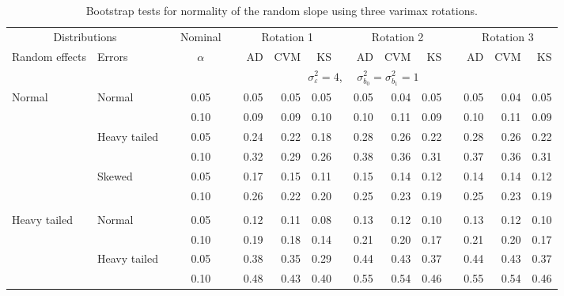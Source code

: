 \documentclass[11pt]{article} %
\begin{document}
\begin{table}[ht]
\begin{scriptsize}
\begin{center}
\begin{tabular}{ll p{.1cm} c p{.1cm} rrr p{.1cm} rrr p{.1cm} rrr}
   \hline
\end{tabular}
\end{center}
\end{scriptsize}
\end{table}

\begin{table}[ht]
\caption{Bootstrap tests for normality of the random slope using three varimax rotations.}
\begin{scriptsize}
\begin{center}
\begin{tabular}{ll p{.1cm} c p{.1cm} rrr p{.1cm} rrr p{.1cm} rrr}
  \hline
  \multicolumn{2}{c}{Distributions}& & Nominal & &  \multicolumn{3}{c}{Rotation 1} & & \multicolumn{3}{c}{Rotation 2} & & \multicolumn{3}{c}{Rotation 3}\\ \cline{1-2} \cline{6-8} \cline{10-12} \cline{14-16}
  Random effects & Errors & & $\alpha$ & & AD & CVM & KS & & AD & CVM & KS & & AD & CVM & KS \\ 
   \hline
& && && \multicolumn{9}{c}{$\sigma_{\varepsilon}^2 = 4$, \ \ $\sigma_{b_0}^2 = \sigma_{b_1}^2 = 1$} \\ \cline{6-16}
Normal       & Normal       && 0.05 &&   0.05 & 0.05 & 0.05 && 0.05 & 0.04 & 0.05 && 0.05 & 0.04 & 0.05 \\ 
             &              && 0.10 &&   0.09 & 0.09 & 0.10 && 0.10 & 0.11 & 0.09 && 0.10 & 0.11 & 0.09 \\ 
             & Heavy tailed && 0.05 &&   0.24 & 0.22 & 0.18 && 0.28 & 0.26 & 0.22 && 0.28 & 0.26 & 0.22 \\ 
             &              && 0.10 &&   0.32 & 0.29 & 0.26 && 0.38 & 0.36 & 0.31 && 0.37 & 0.36 & 0.31 \\ 
             & Skewed       && 0.05 &&   0.17 & 0.15 & 0.11 && 0.15 & 0.14 & 0.12 && 0.14 & 0.14 & 0.12 \\ 
             &              && 0.10 &&   0.26 & 0.22 & 0.20 && 0.25 & 0.23 & 0.19 && 0.25 & 0.23 & 0.19 \\ 
             &&&&&&&&&&&&&&&\\
Heavy tailed & Normal       && 0.05 &&   0.12 & 0.11 & 0.08 && 0.13 & 0.12 & 0.10 && 0.13 & 0.12 & 0.10 \\ 
             &              && 0.10 &&   0.19 & 0.18 & 0.14 && 0.21 & 0.20 & 0.17 && 0.21 & 0.20 & 0.17 \\ 
             & Heavy tailed && 0.05 &&   0.38 & 0.35 & 0.29 && 0.44 & 0.43 & 0.37 && 0.44 & 0.43 & 0.37 \\ 
             &              && 0.10 &&   0.48 & 0.43 & 0.40 && 0.55 & 0.54 & 0.46 && 0.55 & 0.54 & 0.46 \\ 

\end{tabular}
\end{center}
\end{scriptsize}
\end{table}
\end{document}
